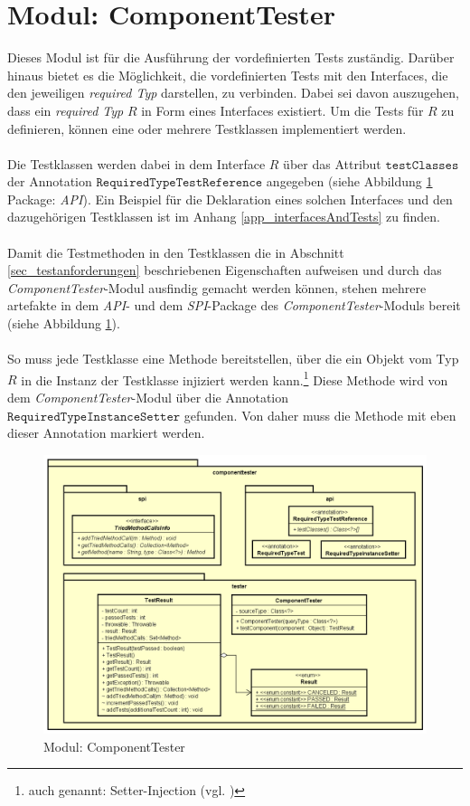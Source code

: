 \section{Modul: ComponentTester}\label{sec_Impl_CT}
Dieses \Gls{Modul} ist für die Ausführung der vordefinierten Tests zuständig. Darüber hinaus bietet es die Möglichkeit, die vordefinierten Tests mit den \Gls{Interface}s, die den jeweiligen \emph{required Typ} darstellen, zu verbinden. Dabei sei davon auszugehen, dass ein \emph{required Typ} $R$ in Form eines \Gls{Interface}s existiert. Um die Tests für $R$ zu definieren, können eine oder mehrere Testklassen implementiert werden.
\\\\
Die Testklassen werden dabei in dem \Gls{Interface} $R$ über das Attribut $\texttt{testClasses}$ der Annotation $\texttt{RequiredTypeTestReference}$ angegeben (siehe Abbildung \ref{fig_cdCompTester} Package: \emph{API}). Ein Beispiel für die Deklaration eines solchen \Gls{Interface}s und den dazugehörigen Testklassen ist im Anhang \ref{app_interfacesAndTests} zu finden.
\\\\
Damit die Testmethoden in den Testklassen die in Abschnitt \ref{sec_testanforderungen} beschriebenen Eigenschaften aufweisen und durch das \emph{ComponentTester}-\Gls{Modul} ausfindig gemacht werden können, stehen mehrere \Gls{artefakt}e in dem \emph{API}- und dem \emph{SPI}-Package des \emph{ComponentTester}-\Gls{Modul}s bereit (siehe Abbildung \ref{fig_cdCompTester}).
\\\\
So muss jede Testklasse eine Methode bereitstellen, über die ein Objekt vom Typ $R$ in die Instanz der Testklasse injiziert werden kann.\footnote{auch genannt: Setter-Injection (vgl. \cite{setterinjection})} Diese Methode wird von dem \emph{ComponentTester}-\Gls{Modul} über die Annotation $\texttt{RequiredTypeInstanceSetter}$ gefunden. Von daher muss die Methode mit eben dieser Annotation markiert werden.
\begin{figure}[h!]
\centering
\includegraphics[scale=0.6]{pics/cd_ComponentTester.png}
\caption{Modul: ComponentTester}
\label{fig_cdCompTester}
\end{figure}
